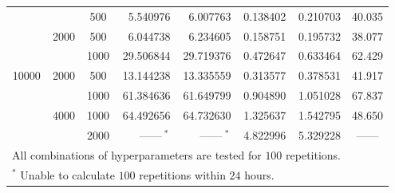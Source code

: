 \documentclass{article}
\begin{document}
\begin{table}[!h]
\begin{tabular}{cccrrrrr}
    \\
    & & 500 & 5.540976 & 6.007763 & 0.138402 & 0.210703 & 40.035
    \\
    & \multirow{2}{*}{2000} & 500 & 6.044738 & 6.234605 & 0.158751 & 0.195732 & 38.077
    \\
    & & 1000 & 29.506844 & 29.719376 & 0.472647 & 0.633464 & 62.429
    \\
    \multirow{4}{*}{10000} & \multirow{2}{*}{2000} & 500 & 13.144238 & 13.335559 & 0.313577 & 0.378531 & 41.917
    \\
    & & 1000 & 61.384636 & 61.649799 & 0.904890 & 1.051028 & 67.837
    \\
    & \multirow{2}{*}{4000} & 1000 & 64.492656 & 64.732630 & 1.325637 & 1.542795 & 48.650
    \\
    & & 2000 & \multicolumn{1}{c}{~~~------$~^*$} & \multicolumn{1}{c}{~~~------$~^*$} & 4.822996 & 5.329228 & \multicolumn{1}{c}{------}
    \\
    \bottomrule
    \multicolumn{7}{l}{All combinations of hyperparameters are tested for $100$ repetitions.}\\
    \multicolumn{7}{l}{$^*$ Unable to calculate $100$ repetitions within $24$ hours.}\\
  \end{tabular}
\end{table}
\end{document}
